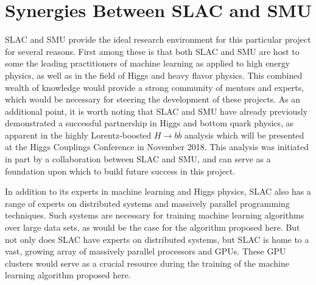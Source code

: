 \documentclass[12pt,letterpaper]{article}
\begin{document}
\section*{Synergies Between SLAC and SMU}
    SLAC and SMU provide the ideal research environment for this particular project for several reasons. First among these is that both SLAC and SMU are host to some the leading practitioners of machine learning as applied to high energy physics, as well as in the field of Higgs and heavy flavor physics. This combined wealth of knowledge would provide a strong community of mentors and experts, which would be necessary for steering the development of these projects. As an additional point, it is worth noting that SLAC and SMU have already previously demonstrated a successful partnership in Higgs and bottom quark physics, as apparent in the highly Lorentz-boosted $H \to b\overline{b}$ analysis which will be presented at the Higgs Couplings Conference in November 2018. This analysis was initiated in part by a collaboration between SLAC and SMU, and can serve as a foundation upon which to build future success in this project.

    In addition to its experts in machine learning and Higgs physics, SLAC also has a range of experts on distributed systems and massively parallel programming techniques. Such systems are necessary for training machine learning algorithms over large data sets, as would be the case for the algorithm proposed here. But not only does SLAC have experts on distributed systems, but SLAC is home to a vast, growing array of massively parallel processors and GPUs. These GPU clusters would serve as a crucial resource during the training of the machine learning algorithm proposed here.
    
\end{document}
